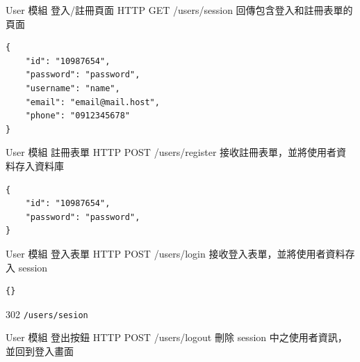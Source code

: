 \documentclass{article}
\begin{document}
{User 模組}
{登入/註冊頁面}
{HTTP GET}
{/users/session}
{回傳包含登入和註冊表單的頁面}

\bigskip

\begin{lrbox}{\jsoninputbox}
	\begin{lstlisting}[basicstyle=\tiny\ttfamily]
{
	"id": "10987654",
	"password": "password",
	"username": "name",
	"email": "email@mail.host",
	"phone": "0912345678"
}
\end{lstlisting}
\end{lrbox}

\begin{lrbox}{\jsonoutputbox}
\end{lrbox}

{User 模組}
{註冊表單}
{HTTP POST}
{/users/register}
{接收註冊表單，並將使用者資料存入資料庫}

\bigskip

\begin{lrbox}{\jsoninputbox}
	\begin{lstlisting}[basicstyle=\tiny\ttfamily]
{
	"id": "10987654",
	"password": "password",
}

\end{lstlisting}
\end{lrbox}

\begin{lrbox}{\jsonoutputbox}
\end{lrbox}

{User 模組}
{登入表單}
{HTTP POST}
{/users/login}
{接收登入表單，並將使用者資料存入 session}

\bigskip

\begin{lrbox}{\jsoninputbox}
	\begin{lstlisting}
{}
\end{lstlisting}
\end{lrbox}

\begin{lrbox}{\jsonoutputbox}
	302 \texttt{/users/sesion}
\end{lrbox}

{User 模組}
{登出按鈕}
{HTTP POST}
{/users/logout}
{刪除 session 中之使用者資訊，並回到登入畫面}
\end{document}

